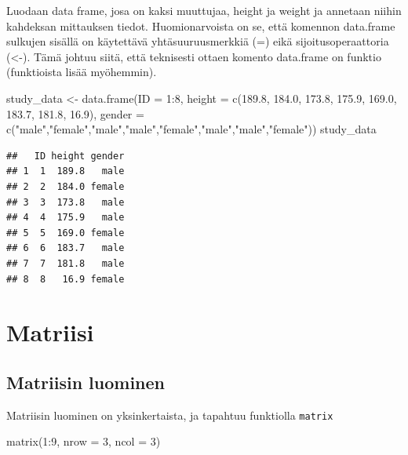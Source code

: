 \documentclass[
]{book}
\newenvironment{Shaded}{\begin{snugshade}}{\end{snugshade}}
\newcommand{\AttributeTok}[1]{\textcolor[rgb]{0.77,0.63,0.00}{#1}}
\newcommand{\DecValTok}[1]{\textcolor[rgb]{0.00,0.00,0.81}{#1}}
\newcommand{\FloatTok}[1]{\textcolor[rgb]{0.00,0.00,0.81}{#1}}
\newcommand{\FunctionTok}[1]{\textcolor[rgb]{0.00,0.00,0.00}{#1}}
\newcommand{\NormalTok}[1]{#1}
\newcommand{\OtherTok}[1]{\textcolor[rgb]{0.56,0.35,0.01}{#1}}
\newcommand{\SpecialCharTok}[1]{\textcolor[rgb]{0.00,0.00,0.00}{#1}}
\newcommand{\StringTok}[1]{\textcolor[rgb]{0.31,0.60,0.02}{#1}}
\begin{document}
Luodaan data frame, josa on kaksi muuttujaa, height ja weight ja annetaan niihin kahdeksan mittauksen tiedot. Huomionarvoista on se, että komennon data.frame sulkujen sisällä on käytettävä yhtäsuuruusmerkkiä (=) eikä sijoitusoperaattoria (\textless-). Tämä johtuu siitä, että teknisesti ottaen komento data.frame on funktio (funktioista lisää myöhemmin).

\begin{Shaded}
\begin{Highlighting}[]
\NormalTok{study\_data }\OtherTok{\textless{}{-}} \FunctionTok{data.frame}\NormalTok{(}\AttributeTok{ID =} \DecValTok{1}\SpecialCharTok{:}\DecValTok{8}\NormalTok{,}
                         \AttributeTok{height =} \FunctionTok{c}\NormalTok{(}\FloatTok{189.8}\NormalTok{, }\FloatTok{184.0}\NormalTok{, }\FloatTok{173.8}\NormalTok{, }\FloatTok{175.9}\NormalTok{, }\FloatTok{169.0}\NormalTok{, }\FloatTok{183.7}\NormalTok{, }\FloatTok{181.8}\NormalTok{, }\FloatTok{16.9}\NormalTok{),}
                         \AttributeTok{gender =} \FunctionTok{c}\NormalTok{(}\StringTok{"male"}\NormalTok{,}\StringTok{"female"}\NormalTok{,}\StringTok{"male"}\NormalTok{,}\StringTok{"male"}\NormalTok{,}\StringTok{"female"}\NormalTok{,}\StringTok{"male"}\NormalTok{,}\StringTok{"male"}\NormalTok{,}\StringTok{"female"}\NormalTok{))}
\NormalTok{study\_data}
\end{Highlighting}
\end{Shaded}

\begin{verbatim}
##   ID height gender
## 1  1  189.8   male
## 2  2  184.0 female
## 3  3  173.8   male
## 4  4  175.9   male
## 5  5  169.0 female
## 6  6  183.7   male
## 7  7  181.8   male
## 8  8   16.9 female
\end{verbatim}

\hypertarget{matriisi}{%
\section{Matriisi}\label{matriisi}}

\hypertarget{matriisin-luominen}{%
\subsection{Matriisin luominen}\label{matriisin-luominen}}

Matriisin luominen on yksinkertaista, ja tapahtuu funktiolla \texttt{matrix}

\begin{Shaded}
\begin{Highlighting}[]
\FunctionTok{matrix}\NormalTok{(}\DecValTok{1}\SpecialCharTok{:}\DecValTok{9}\NormalTok{, }\AttributeTok{nrow =} \DecValTok{3}\NormalTok{, }\AttributeTok{ncol =} \DecValTok{3}\NormalTok{)}
\end{Highlighting}
\end{Shaded}
\end{document}
